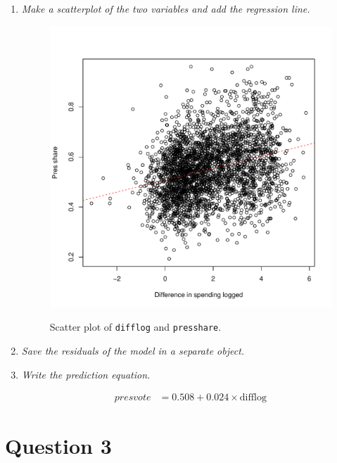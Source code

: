 \documentclass[12pt,letterpaper]{article}
\begin{document}
\begin{enumerate}
		\item \emph{Make a scatterplot of the two variables and add the regression line. }	\vspace{.25cm}
		
						  
		
		\begin{figure}[h!]\centering
			\caption{\footnotesize Scatter plot of \texttt{difflog} and \texttt{presshare}.}\vspace{-1cm}
			\label{fig:Q2_b}
			\includegraphics[width=.65\textwidth]{Q2_b.pdf}\\
		\end{figure}
		
		\item \emph{Save the residuals of the model in a separate object.}	\vspace{.25cm}
									  
		\vspace{.5cm}
		\item \emph{Write the prediction equation.}\vspace{.25cm}
		
		\begin{align*}
		presvote &= 0.508 + 0.024 \times \text{difflog}
		\end{align*}
	\end{enumerate}
\newpage
	\section*{Question 3}
	
\end{document}
